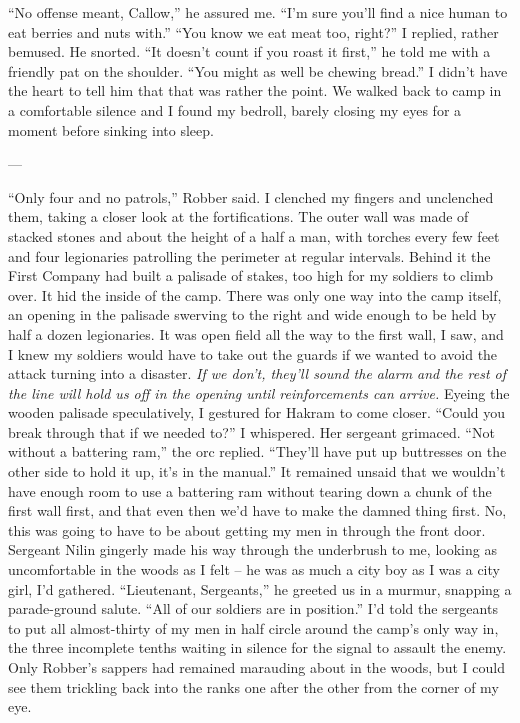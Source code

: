 \documentclass[12pt, openany]{book}
\begin{document}
“No offense meant, Callow,” he assured me. “I’m sure you’ll find a nice human to eat berries and nuts with.”
“You know we eat meat too, right?” I replied, rather bemused.
He snorted.
“It doesn’t count if you roast it first,” he told me with a friendly pat on the shoulder. “You might as well be chewing bread.”
I didn’t have the heart to tell him that that was rather the point. We walked back to camp in a comfortable silence and I found my bedroll, barely closing my eyes for a moment before sinking into sleep.

—

“Only four and no patrols,” Robber said.
I clenched my fingers and unclenched them, taking a closer look at the fortifications. The outer wall was made of stacked stones and about the height of a half a man, with torches every few feet and four legionaries patrolling the perimeter at regular intervals. Behind it the First Company had built a palisade of stakes, too high for my soldiers to climb over. It hid the inside of the camp. There was only one way into the camp itself, an opening in the palisade swerving to the right and wide enough to be held by half a dozen legionaries. It was open field all the way to the first wall, I saw, and I knew my soldiers would have to take out the guards if we wanted to avoid the attack turning into a disaster. \textit{If we don’t, they’ll sound the alarm and the rest of the line will hold us off in the opening until reinforcements can arrive.} Eyeing the wooden palisade speculatively, I gestured for Hakram to come closer.
“Could you break through that if we needed to?” I whispered.
Her sergeant grimaced.
“Not without a battering ram,” the orc replied. “They’ll have put up buttresses on the other side to hold it up, it’s in the manual.”
It remained unsaid that we wouldn’t have enough room to use a battering ram without tearing down a chunk of the first wall first, and that even then we’d have to make the damned thing first. No, this was going to have to be about getting my men in through the front door. Sergeant Nilin gingerly made his way through the underbrush to me, looking as uncomfortable in the woods as I felt – he was as much a city boy as I was a city girl, I’d gathered.
“Lieutenant, Sergeants,” he greeted us in a murmur, snapping a parade-ground salute. “All of our soldiers are in position.”
I’d told the sergeants to put all almost-thirty of my men in half circle around the camp’s only way in, the three incomplete tenths waiting in silence for the signal to assault the enemy. Only Robber’s sappers had remained marauding about in the woods, but I could see them trickling back into the ranks one after the other from the corner of my eye.
\end{document}
